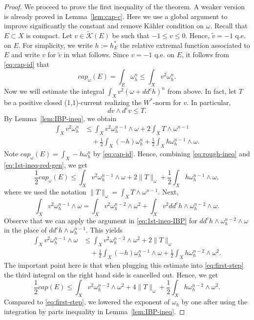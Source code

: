 \documentclass{amsart}
\newcommand{\wt}[1]{\widetilde{#1}}
\newcommand{\om}{\omega}
\newcommand{\cali}[1]{\mathscr{#1}}
\newcommand{\Kc}{\cali{K}}
\theoremstyle{definition}
\numberwithin{thm}{section}
\numberwithin{equation}{section}
\renewcommand{\[}{\begin{equation}}
\renewcommand{\]}{\end{equation}}
\newcommand{\wed}{\wedge}
\begin{document}
\begin{proof}
We proceed to prove the first inequality of the theorem. 
A weaker version  is already proved in Lemma~\ref{lem:cap-c}. Here we use a global argument to improve significantly the constant and remove K\"ahler condition on $\om$. Recall that $E\subset X$ is compact. Let  $v\in \wt\Kc(E)$ be such that $-1 \leq v \leq 0$. Hence, $\wt v = -1$ q.e. on $E$.  For simplicity, we write  $h:= h_E^*$ the relative extremal function associated to $E$ and write $v$  for $\wt v$ in what follows. 
Since $v = -1$ q.e. on $E$, it follows from \eqref{eq:cap-id} that 
\[\label{eq:rough-ineq} 
	cap_\om(E) =\int_E   \om_h^n \leq \int_X v^2 \om_h^n.
\]
Now we will estimate the integral
$
	\int_X v^2 (\om + dd^c h)^n
$
from above. In fact, let $T$ be a positive closed (1,1)-current realizing the $W^*$-norm for $v$. In particular, 
$$
	dv \wed d^c v \leq T.
$$
By  Lemma~\ref{lem:IBP-ineq},  we obtain
\[\label{eq:1st-ineq-red-gen}\begin{aligned}
	\int_X v^2 \om_h^n 
&\leq 	\int_X v^2 \om_h^{n-1}\wed \om  	+ 2 \int_X T \wed\om^{n-1} \\ 
&\quad 	+ \frac{1}{2} \int_X (-h) \om_h^n + \frac{1}{2} \int_X h\om_h^{n-1}\wed \om.
\end{aligned}\]
Note  $cap_\om(E) = \int_X -h \om_h^n$ by \eqref{eq:cap-id}. Hence, combining  \eqref{eq:rough-ineq} and \eqref{eq:1st-ineq-red-gen}, we get 
\[\label{eq:first-step}
	\frac{1}{2} cap_\om(E) \leq \int_X v^2 \om_h^{n-1} \wed \om + 2 \|T\|_\om + \frac{1}{2} \int_X h\om_h^{n-1} \wed \om,
\]
where we used the notation $\|T\|_\om = \int_X T\wed \om^{n-1}$.
Next, 
$$
	\int_X v^2 \om_h^{n-1} \wed \om =\int_X v^2\om_h^{n-2} \wed \om^2 +  \int_X v^2 dd^c h \wed \om_h^{n-2}\wed \om.
$$
Observe that we  can apply the argument in \eqref{eq:1st-ineq-IBP}  for  $dd^c h\wed \om_h^{n-2}\wed\om$  in the place of $dd^c h \wed \om_h^{n-1}$. This  yields
\[\label{eq:inductive-step}
\begin{aligned}
	\int_X v^2 \om_h^{n-1} \wed \om 
&\leq 	\int_X v^2\om_h^{n-2} \wed \om^2  + 2 \|T\|_\om \\
&\quad + \frac{1}{2} \int_X(-h) \om_h^{n-1} \wed \om + \frac{1}{2}\int_X h \om_h^{n-2}\wed\om^2.
\end{aligned}\]
The important point here is  that  when plugging this estimate into \eqref{eq:first-step} the third integral on the right hand side is cancelled out. Hence, 
 we get
$$
	\frac{1}{2} cap (E) \leq   \int_X v^2\om_h^{n-2}\wed\om^2 + 4 \|T\|_\om + \frac{1}{2} \int_X h\om_h^{n-2}\wed \om^2.
$$
Compared to \eqref{eq:first-step}, we lowered the exponent of $\om_h$ by one after using the integration by parts inequality  in Lemma~\ref{lem:IBP-ineq}.

\end{proof}
\end{document}
